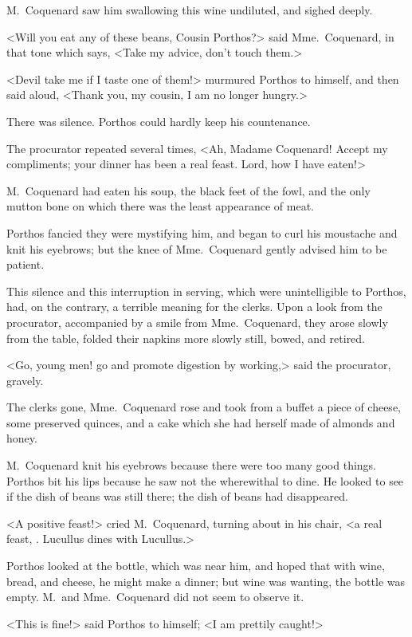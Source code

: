 M.~Coquenard saw him swallowing this wine undiluted, and sighed deeply. 

<Will you eat any of these beans, Cousin Porthos?> said Mme.~Coquenard, in that tone which says, <Take my advice, don't touch them.> 

<Devil take me if I taste one of them!> murmured Porthos to himself, and then said aloud, <Thank you, my cousin, I am no longer hungry.> 

There was silence. Porthos could hardly keep his countenance. 

The procurator repeated several times, <Ah, Madame Coquenard! Accept my compliments; your dinner has been a real feast. Lord, how I have eaten!> 

M.~Coquenard had eaten his soup, the black feet of the fowl, and the only mutton bone on which there was the least appearance of meat. 

Porthos fancied they were mystifying him, and began to curl his moustache and knit his eyebrows; but the knee of Mme.~Coquenard gently advised him to be patient. 

This silence and this interruption in serving, which were unintelligible to Porthos, had, on the contrary, a terrible meaning for the clerks. Upon a look from the procurator, accompanied by a smile from Mme.~Coquenard, they arose slowly from the table, folded their napkins more slowly still, bowed, and retired. 

<Go, young men! go and promote digestion by working,> said the procurator, gravely. 

The clerks gone, Mme.~Coquenard rose and took from a buffet a piece of cheese, some preserved quinces, and a cake which she had herself made of almonds and honey. 

M.~Coquenard knit his eyebrows because there were too many good things. Porthos bit his lips because he saw not the wherewithal to dine. He looked to see if the dish of beans was still there; the dish of beans had disappeared. 

<A positive feast!> cried M.~Coquenard, turning about in his chair, <a real feast, . Lucullus dines with Lucullus.> 

Porthos looked at the bottle, which was near him, and hoped that with wine, bread, and cheese, he might make a dinner; but wine was wanting, the bottle was empty. M.~and Mme.~Coquenard did not seem to observe it. 

<This is fine!> said Porthos to himself; <I am prettily caught!> 

